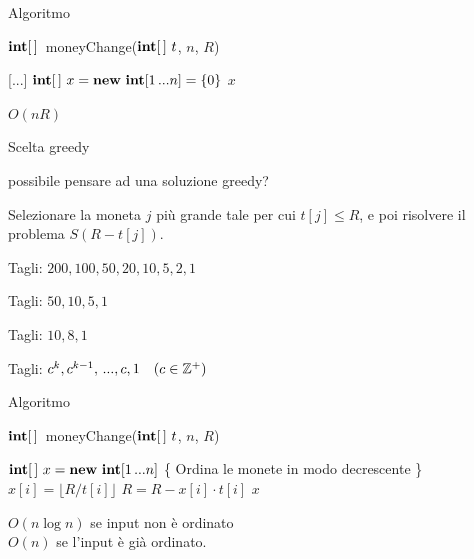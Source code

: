 \begin{frame}{Algoritmo}

\vspace{-12pt}
\begin{Procedure}
\caption[A]{$\INTARRAY$\ \textsf{moneyChange}($\INTARRAY\ t$, \INTEGER $n$, \INTEGER $R$)}
[...]\;
$\INTARRAY\ x = \NEW\ \INTEGER[1 \mydots n] = \{ 0 \}$
\Return $x$\;
\end{Procedure}

\pause \alert{$O(nR)$}

\end{frame}




\begin{frame}{Scelta greedy}

\vspace{-6pt}
\begin{myboxtitle}[Domanda]
\EE possibile pensare ad una soluzione greedy?
\end{myboxtitle}

\pause
\begin{myboxtitle}[Risposta]
Selezionare la moneta $j$ più grande tale per cui $t[j] \leq R$, e poi risolvere 
il problema $S(R-t[j])$.
\end{myboxtitle}

\pause
\begin{myboxtitle}[Esempi]
\BIL
\item Tagli: $200, 100, 50, 20, 10, 5, 2, 1$
\item Tagli: $50, 10, 5, 1$
\item Tagli: $10, 8, 1$
\item Tagli: $c^k, c^{k-1}, \mydots, c, 1 \quad (c \in \mathbb{Z^+})$
\EIL
\end{myboxtitle}


\end{frame}

\begin{frame}{Algoritmo}
	
\vspace{-12pt}
\begin{Procedure}
\caption[A]{$\INTARRAY$\ \textsf{moneyChange}($\INTARRAY\ t$, \INTEGER $n$, \INTEGER $R$)}
$\INTARRAY\ x = \NEW\ \INTEGER[1 \mydots n]$\;
\{ Ordina le monete in modo decrescente \}\;
 {
  $x[i] = \lfloor R/t[i] \rfloor$\;
  $R = R - x[i] \cdot t[i]$\;
}
\Return $x$\;
\end{Procedure}
	
 $O(n \log n)$ se input non è ordinato\\
\makebox[2.5cm][l]{} $O(n)$ se l'input è già ordinato.

\end{frame}

